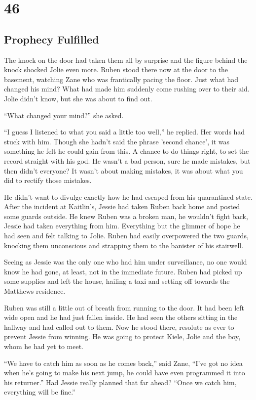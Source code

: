 \chapter{46}
\section{Prophecy Fulfilled}


The knock on the door had taken them all by surprise and the figure behind the knock shocked Jolie even more.  Ruben stood there now at the door to the basement, watching Zane who was frantically pacing the floor.  Just what had changed his mind?  What had made him suddenly come rushing over to their aid.  Jolie didn't know, but she was about to find out.

``What changed your mind?'' she asked.  

``I guess I listened to what you said a little too well,'' he replied.  Her words had stuck with him.  Though she hadn't said the phrase 'second chance', it was something he felt he could gain from this.  A chance to do things right, to set the record straight with his god.  He wasn't a bad person, sure he made mistakes, but then didn't everyone?  It wasn't about making mistakes, it was about what you did to rectify those mistakes.  

He didn't want to divulge exactly how he had escaped from his quarantined state.  After the incident at Kaitlin's, Jessie had taken Ruben back home and posted some guards outside.  He knew Ruben was a broken man, he wouldn't fight back, Jessie had taken everything from him.  Everything but the glimmer of hope he had seen and felt talking to Jolie.   Ruben had easily overpowered the two guards, knocking them unconscious and strapping them to the banister of his stairwell.  

Seeing as Jessie was the only one who had him under surveillance, no one would know he had gone, at least, not in the immediate future.  Ruben had picked up some supplies and left the house, hailing a taxi and setting off towards the Matthews residence.  

Ruben was still a little out of breath from running to the door.  It had been left wide open and he had just fallen inside.  He had seen the others sitting in the hallway and had called out to them.  Now he stood there, resolute as ever to prevent Jessie from winning.  He was going to protect Kiele, Jolie and the boy, whom he had yet to meet.

``We have to catch him as soon as he comes back,'' said Zane, ``I've got no idea when he's going to make his next jump, he could have even programmed it into his returner.''  Had Jessie really planned that far ahead?  ``Once we catch him, everything will be fine.''


